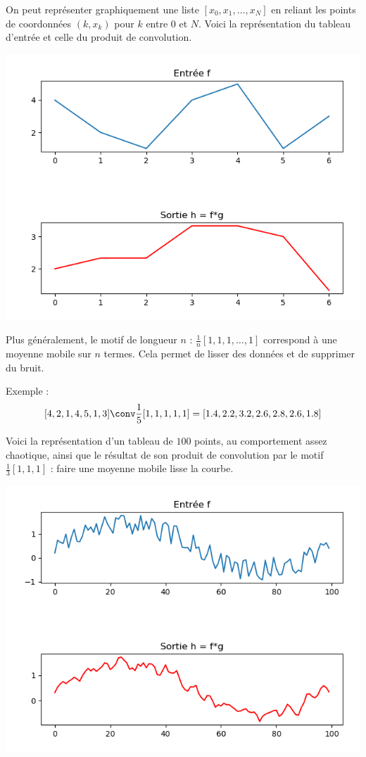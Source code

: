 \documentclass[11pt,class=report,crop=false]{standalone}
\begin{document}
On peut représenter graphiquement une liste $[x_0,x_1,\ldots,x_N]$ en reliant les points de coordonnées $(k,x_k)$ pour $k$ entre $0$ et $N$. Voici la représentation du tableau d'entrée et celle du produit de convolution.
\begin{center}
\includegraphics[scale=\myscale,scale=0.6]{figures/convolution-1d-1}
\end{center}

Plus généralement, le motif de longueur $n$ : $\frac1n[1,1,1,\ldots,1]$ correspond à une moyenne mobile sur $n$ termes. Cela permet de \og{}lisser\fg{} des données et de supprimer du \og{}bruit\fg{}.

Exemple :
$$[4, 2, 1, 4, 5, 1, 3] \conv \frac15[1,1,1,1,1] = [1.4, 2.2, 3.2, 2.6, 2.8, 2.6, 1.8]$$


\bigskip

Voici la représentation d'un tableau de $100$ points, au comportement assez chaotique, ainsi que le résultat de son produit de convolution par le motif $\frac13[1,1,1]$ : faire une moyenne mobile \og{}lisse\fg{} la courbe.
 
\begin{center}
\includegraphics[scale=\myscale,scale=0.6]{figures/convolution-1d-2}
\end{center}
\end{document}
